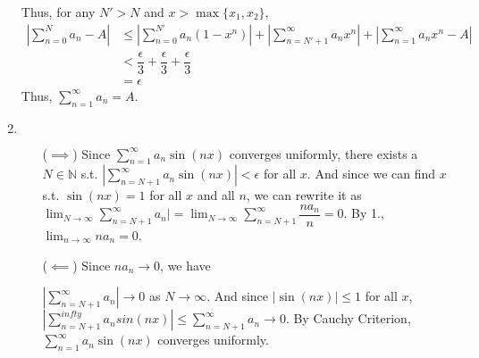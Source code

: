 \documentclass[12pt]{article}
\begin{document}
\begin{enumerate}
    Thus, for any $N' > N$ and $x > \max\{ x_1, x_2\}$,
    \begin{align*}
        |\sum_{n=0}^{N} a_n - A| &\leq |\sum_{n=0}^{N'} a_n(1-x^n)| + |\sum_{n=N'+1}^{\infty} a_n x^n | + |\sum_{n=1}^{\infty} a_nx^n - A|\\
        &< \dfrac{\epsilon}{3} + \dfrac{\epsilon}{3} + \dfrac{\epsilon}{3}\\
        &= \epsilon
    \end{align*}
    Thus, $\displaystyle\sum_{n=1}^{\infty} a_n = A$.

    \item $\ $\begin{enumerate}
        \item[($\implies$)] Since $\displaystyle\sum_{n=1}^{\infty} a_n \sin(nx)$ converges uniformly, 
        there exists a $N \in \mathbb{N}$ s.t. $|\displaystyle\sum_{n=N+1}^{\infty} a_n \sin(nx)| < \epsilon$ for all $x$.
        And since we can find $x$ s.t. $\sin(nx) = 1$ for all $x$ and all $n$, 
        we can rewrite it as $\displaystyle\lim_{N\to\infty}\displaystyle\sum_{n=N+1}^{\infty} a_n| = \displaystyle\lim_{N\to\infty} \displaystyle\sum_{n=N+1}^{\infty} \dfrac{na_n}{n} = 0$.
        By 1., $\displaystyle\lim_{n\to\infty} na_n = 0$.

        \item[($\impliedby$)] Since $na_n \to 0$, we have 
        
        $\left|\displaystyle\sum_{n=N+1}^{\infty} a_n\right|\to 0$ as $N\to\infty$.
        And since $|\sin(nx)| \leq 1$ for all $x$, $\left|\displaystyle\sum_{n=N+1}^{infty} a_n sin(nx)\right| \leq \displaystyle\sum_{n=N+1}^{\infty} a_n \to 0$.
        By Cauchy Criterion, $\displaystyle\sum_{n=1}^{\infty} a_n \sin(nx)$ converges uniformly.

    \end{enumerate}
\end{enumerate}
\end{document}
